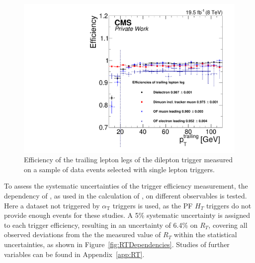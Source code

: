 \begin{figure}
\begin{center}
\includegraphics[scale=0.35]{plots/BG/trigger/Triggereff_SingleLepton_HighHTExclusive_Full2012_TrailingPt_leadingPt30Single.pdf}
\caption{Efficiency of the trailing lepton legs of the dilepton trigger measured on a sample of data events selected with single lepton triggers.}
\label{fig:triggerEffTrailing}
\end{center}
\end{figure} 
To assess the systematic uncertainties of the trigger efficiency measurement, the dependency of \RT, as used in the calculation of \Rsfof, on different observables is tested. Here a dataset not triggered by $\alpha_\mathrm{T}$ triggers is used, as the PF $H_T$ triggers do not provide enough events for these studies. A 5\% systematic uncertainty is assigned to each trigger efficiency, resulting in an uncertainty of 6.4\% on $R_T$, covering all observed deviations from the the measured value of $R_T$ within the statistical uncertainties, as shown in Figure~\ref{fig:RTDependencies}. Studies of further variables can be found in Appendix~\ref{app:RT}.
